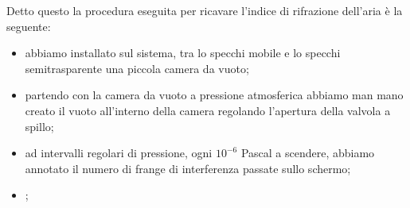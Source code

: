 Detto questo la procedura eseguita per ricavare l'indice di rifrazione dell'aria è la seguente:
\begin{itemize}
	\item{abbiamo installato sul sistema, tra lo specchi mobile e lo specchi semitrasparente una piccola camera da vuoto;} %
	\item{partendo con la camera da vuoto a pressione atmosferica abbiamo man mano creato il vuoto all'interno della camera regolando l'apertura della valvola a spillo;}
	\item{ad intervalli regolari di pressione, ogni $10^{-6}$ Pascal a scendere, abbiamo annotato il numero di frange di interferenza passate sullo schermo;}
	\item{;}
\end{itemize} 

  
